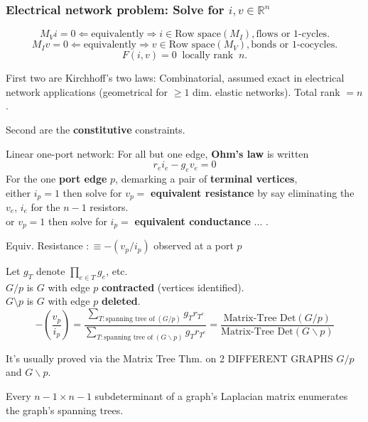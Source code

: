 \documentclass{beamer}
\newcommand{\Reals}{\ensuremath{\mathbb{R}}}
\begin{document}
\begin{frame}
\frametitle{Electrical network problem: Solve for $i,v\in\Reals^n$}

\[
M_Vi = 0 \Leftarrow\text{equivalently}\Rightarrow i\in\text{Row space}{(M_I)},
\text{flows or 1-cycles}.
\]
\[
M_Iv = 0 \Leftarrow\text{equivalently}\Rightarrow v\in\text{Row space}{(M_V)},
\text{bonds or 1-cocycles}.
\]
\[
F(i,v) = 0 \;\;\text{locally rank}\;\;n.
\]

First two are Kirchhoff's two laws:  Combinatorial, assumed exact in electrical 
network applications (geometrical for $\ge 1$ dim. elastic networks).  
Total rank $= n$. 

Second are the \textbf{constitutive} constraints.

Linear one-port network:  For all but one edge, \textbf{Ohm's law} is written
\[r_ei_e - g_e v_e = 0\]
For the one \textbf{port edge} $p$, demarking a pair of 
\textbf{terminal vertices},\\
either
$i_p = 1$ then solve for $v_p=$ \textbf{equivalent resistance}
by say eliminating the $v_e$, $i_e$ for the $n-1$ resistors.\\
or $v_p = 1$ then solve for $i_p=$ \textbf{equivalent conductance} ... .

\end{frame}


\begin{frame}{Equiv. Resistance $ :\equiv -(v_p/i_p)$
observed at a port $p$ 
}

\begin{theorem}
Let $g_T$ denote $\prod_{e\in T}g_e$, etc.\\
$G/p$ is $G$ with edge $p$ \textbf{contracted} (vertices identified).\\
$G\setminus p$ is $G$ with edge $p$ \textbf{deleted}.\\
\[
-(\frac{v_p}{i_p})=
\frac{\sum_{T:\text{spanning tree of}\;(G/p)}g_Tr_{T^c}}
{\sum_{T:\text{spanning tree of}\;(G\backslash p)}g_Tr_{T^c}}
= \frac{\mbox{Matrix-Tree Det}(G/p)}
       {\mbox{Matrix-Tree Det}(G\backslash p)}
\]
\end{theorem}

It's usually proved 
via the Matrix Tree Thm. on 2 DIFFERENT GRAPHS
$G/p$ and $G\backslash p$.  

\begin{theorem}
Every $n-1 \times n-1$ subdeterminant of a graph's Laplacian
matrix enumerates the graph's spanning trees.
\end{theorem}

\end{frame}
\end{document}
